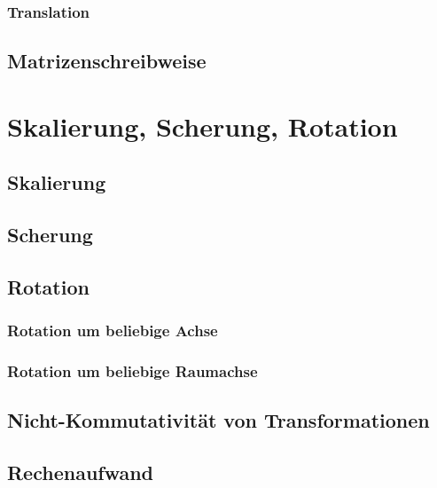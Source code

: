 \documentclass[a4paper, 11pt, accentcolor = tud3b]{tudreport}
\begin{document}
				\subsubsection{Translation} %

			\subsection{Matrizenschreibweise} %

		\section{Skalierung, Scherung, Rotation} %

			\subsection{Skalierung} %

			\subsection{Scherung} %

			\subsection{Rotation} %

				\subsubsection{Rotation um beliebige Achse} %

				\subsubsection{Rotation um beliebige Raumachse} %

			\subsection{Nicht-Kommutativität von Transformationen} %

			\subsection{Rechenaufwand} %
\end{document}
